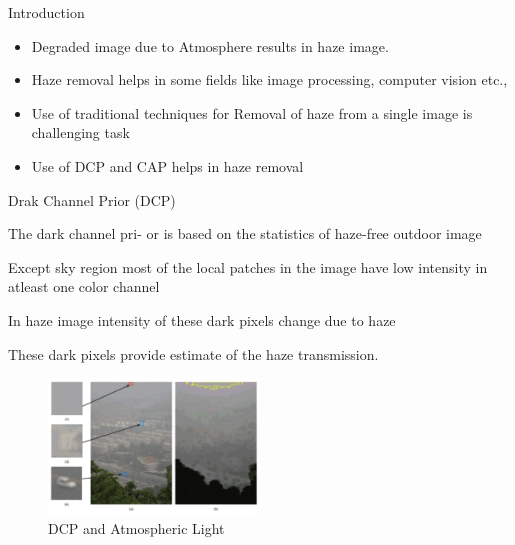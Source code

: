 \documentclass{beamer}
\begin{document}
\begin{frame}[t]{Introduction}
    \vspace{0.7cm} 
    
\begin{itemize}

\item {Degraded image due to Atmosphere results in haze image.}
\item {Haze removal helps in some fields like image processing, computer vision etc.,}

\item {Use of traditional techniques for Removal of haze from a single image is challenging task}
\item {Use of DCP and CAP helps in haze removal}


\end{itemize}

\end{frame}
\begin{frame}[t]{Drak Channel Prior (DCP)}

\item{The dark channel pri-
or is based on the statistics of haze-free outdoor image}
\item{Except sky region most of the local patches in the image have low intensity in atleast one color channel}
\item{In haze image intensity of these dark pixels change due to haze}
\item{These dark pixels provide estimate of the haze transmission.}
\begin{figure}[htbp!]
    \centering
    \includegraphics[width=0.5\textwidth]{figures/dcp.pdf}
    \caption{DCP and Atmospheric Light}
\end{figure}
\end{frame}
\end{document}
